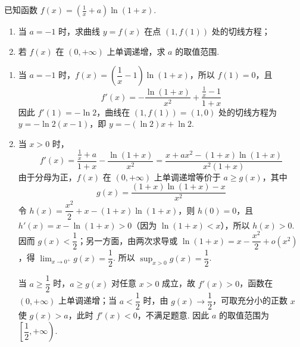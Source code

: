 \begin{problem}
已知函数 \(f(x)=\left(\frac1x+a\right)\ln(1+x)\).
\begin{enumerate}
\item 当 \(a=-1\) 时，求曲线 \(y=f(x)\) 在点 \((1,f(1))\) 处的切线方程；
\item 若 \(f(x)\) 在 \((0,+\infty)\) 上单调递增，求 \(a\) 的取值范围.
\end{enumerate}

\begin{solution}
\begin{enumerate}
\item 当 \(a=-1\) 时，\(f(x)=\left(\dfrac1x-1\right)\ln(1+x)\)，所以 \(f(1)=0\)，且
\[
f'(x)=-\frac{\ln(1+x)}{x^2}+\frac{\frac{1}{x}-1}{1+x}
\]
因此 \(f'(1)=-\ln2\)，曲线在 \((1,f(1))=(1,0)\) 处的切线方程为 \(y=-\ln2(x-1)\)，即 \(y=-(\ln2)x+\ln2\).
\item 当 \(x>0\) 时，
\[
f'(x)=\frac{\frac{1}{x}+a}{1+x}-\frac{\ln(1+x)}{x^2}=\frac{x+ax^2-(1+x)\ln(1+x)}{x^2(1+x)}
\]
由于分母为正，\(f(x)\) 在 \((0,+\infty)\) 上单调递增等价于
\(a\ge g(x)\)，其中
\[
g(x)=\frac{(1+x)\ln(1+x)-x}{x^2}
\]
令 \(h(x)=\dfrac{x^2}{2}+x-(1+x)\ln(1+x)\)，则 \(h(0)=0\)，且 \(h'(x)=x-\ln(1+x)>0\)（因为 \(\ln(1+x)<x\)），所以 \(h(x)>0\). 因而
\(g(x)<\dfrac12\)；另一方面，由两次求导或 \(\ln(1+x)=x-\dfrac{x^2}{2}+o(x^2)\)，得 \(\lim_{x\to0^+}g(x)=\dfrac12\). 所以 \(\sup_{x>0}g(x)=\dfrac12\).

当 \(a\ge\dfrac12\) 时，\(a\ge g(x)\) 对任意 \(x>0\) 成立，故 \(f'(x)>0\)，函数在 \((0,+\infty)\) 上单调递增；当 \(a<\dfrac12\) 时，由 \(g(x)\to\dfrac12\)，可取充分小的正数 \(x\) 使 \(g(x)>a\)，此时 \(f'(x)<0\)，不满足题意. 因此 \(a\) 的取值范围为 \(\left[\dfrac12,+\infty\right)\).
\end{enumerate}
\end{solution}
\end{problem}

